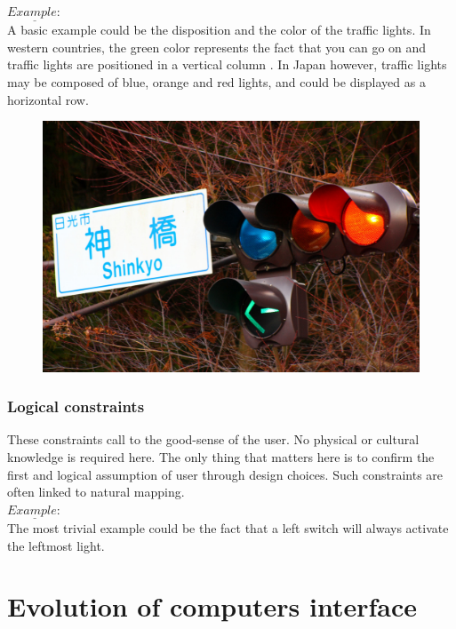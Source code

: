\documentclass[a4paper,11pt] {article}
\theoremstyle{definition}
\begin{document}
        $\underline{Example:}$\\
        A basic example could be the disposition and the color of the traffic lights. In western countries, the green color represents the fact that you can go on and traffic lights are positioned in a vertical column . In Japan however, traffic lights may be composed of blue, orange and red lights, and could be displayed as a horizontal row.
        \begin{figure}[h]
        \centering
        \includegraphics[scale=0.1]{fig-report/japan-traffic-light.jpg}
        \end{figure}

        \subsubsection{Logical constraints}
        These constraints call to the good-sense of the user. No physical or cultural knowledge is required here. The only thing that matters here is to confirm the first and logical assumption of user through design choices. Such constraints are often linked to natural mapping.\\

        $\underline{Example:}$\\
        The most trivial example could be the fact that a left switch will always activate the leftmost light.

\section{Evolution of computers interface}
\label{sct:history}
\end{document}
